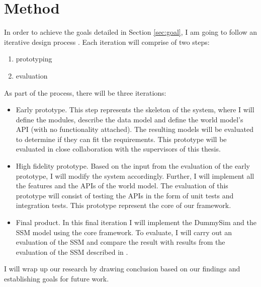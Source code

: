 \section{Method} %
\label{sec:method}

In order to achieve the goals detailed in Section \ref{sec:goal}, I am going to follow an iterative design process \cite{mackay1997hci}. Each iteration will comprise of two steps:
\begin{enumerate}
	\item prototyping
	\item evaluation
\end{enumerate}

As part of the process, there will be three iterations:
\begin{itemize}
	\item Early prototype. This step represents the skeleton of the system, where I will define the modules, describe the data model and define the world model's API (with no functionality attached). The resulting models will be evaluated to determine if they can fit the requirements. This prototype will be evaluated in close collaboration with the supervisors of this thesis.
	\item High fidelity prototype. Based on the input from the evaluation of the early prototype, I will modify the system accordingly. Further, I will implement all the features and the APIs of the world model. The evaluation of this prototype will consist of testing the APIs in the form of unit tests and integration tests. This prototype represent the core of our framework.
	\item Final product. In this final iteration I will implement the DummySim and the SSM model using the core framework. To evaluate, I will carry out an evaluation of the SSM and compare the result with results from the evaluation of the SSM described in \cite{pederson2011situative}.
\end{itemize}

I will wrap up our research by drawing conclusion based on our findings and establishing goals for future work.

